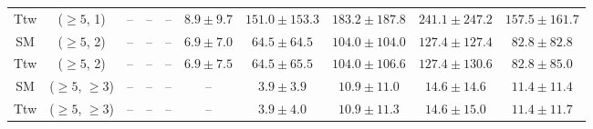 \begin{table}[h!]
{\begin{tabular}{cccccccccc}
	Ttw & ($\ge5$, 1) & -- & -- & -- & $8.9\pm 9.7$ & $151.0\pm 153.3$ & $183.2\pm 187.8$ & $241.1\pm 247.2$ & $157.5\pm 161.7$ \\[0.5ex] 
	SM & ($\ge5$, 2) & -- & -- & -- & $6.9\pm 7.0$ & $64.5\pm 64.5$ & $104.0\pm 104.0$ & $127.4\pm 127.4$ & $82.8\pm 82.8$ \\[0.5ex] 
	Ttw & ($\ge5$, 2) & -- & -- & -- & $6.9\pm 7.5$ & $64.5\pm 65.5$ & $104.0\pm 106.6$ & $127.4\pm 130.6$ & $82.8\pm 85.0$ \\[0.5ex] 
	SM & ($\ge5$, $\ge3$) & -- & -- & -- & -- & $3.9\pm 3.9$ & $10.9\pm 11.0$ & $14.6\pm 14.6$ & $11.4\pm 11.4$ \\[0.5ex] 
	Ttw & ($\ge5$, $\ge3$) & -- & -- & -- & -- & $3.9\pm 4.0$ & $10.9\pm 11.3$ & $14.6\pm 15.0$ & $11.4\pm 11.7$ \\[0.5ex] 
	\hline
	\hline
\end{tabular}}
\end{table}
